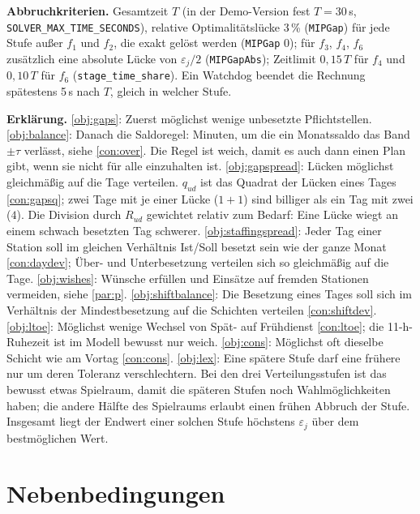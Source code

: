 \documentclass[11pt]{combiArticle}
\newcommand{\code}[1]{\texttt{#1}}
\begin{document}
\textbf{Abbruchkriterien.} Gesamtzeit $T$ (in der Demo-Version fest $T = 30$\,s, \code{SOLVER\_MAX\_TIME\_SECONDS}),
relative Optimalitätslücke 3\,\% (\code{MIPGap}) für jede Stufe außer $f_1$ und $f_2$, die exakt gelöst
werden (\code{MIPGap} 0); für $f_3$, $f_4$, $f_6$ zusätzlich eine absolute
Lücke von $\varepsilon_j/2$ (\code{MIPGapAbs}); Zeitlimit $0{,}15\,T$ für $f_4$ und $0{,}10\,T$ für $f_6$
(\code{stage\_time\_share}). Ein Watchdog beendet die Rechnung spätestens 5\,s nach $T$, gleich in welcher Stufe.

\textbf{Erklärung.}
\eqref{obj:gaps}: Zuerst möglichst wenige unbesetzte Pflichtstellen.
\eqref{obj:balance}: Danach die Saldoregel: Minuten, um die ein Monatssaldo das Band $\pm\tau$ verlässt,
siehe \eqref{con:over}. Die Regel ist weich, damit es auch dann einen Plan gibt, wenn sie nicht für alle
einzuhalten ist.
\eqref{obj:gapspread}: Lücken möglichst gleichmäßig auf die Tage verteilen. $q_{ud}$ ist das Quadrat der
Lücken eines Tages \eqref{con:gapsq}; zwei Tage mit je einer Lücke ($1+1$) sind billiger als ein Tag mit zwei
($4$). Die Division durch $R_{ud}$ gewichtet relativ zum Bedarf: Eine Lücke wiegt an einem schwach besetzten
Tag schwerer.
\eqref{obj:staffingspread}: Jeder Tag einer Station soll im gleichen Verhältnis Ist/Soll besetzt sein wie der
ganze Monat \eqref{con:daydev}; Über- und Unterbesetzung verteilen sich so gleichmäßig auf die Tage.
\eqref{obj:wishes}: Wünsche erfüllen und Einsätze auf fremden Stationen vermeiden, siehe \eqref{par:p}.
\eqref{obj:shiftbalance}: Die Besetzung eines Tages soll sich im Verhältnis der Mindestbesetzung auf die
Schichten verteilen \eqref{con:shiftdev}.
\eqref{obj:ltoe}: Möglichst wenige Wechsel von Spät- auf Frühdienst \eqref{con:ltoe}; die 11-h-Ruhezeit ist
im Modell bewusst nur weich.
\eqref{obj:cons}: Möglichst oft dieselbe Schicht wie am Vortag \eqref{con:cons}.
\eqref{obj:lex}: Eine spätere Stufe darf eine frühere nur um deren Toleranz verschlechtern. Bei den drei
Verteilungsstufen ist das bewusst etwas Spielraum, damit die späteren Stufen noch Wahlmöglichkeiten haben;
die andere Hälfte des Spielraums erlaubt einen frühen Abbruch der Stufe. Insgesamt liegt der Endwert einer
solchen Stufe höchstens $\varepsilon_j$ über dem bestmöglichen Wert.

\section{Nebenbedingungen}
\end{document}
